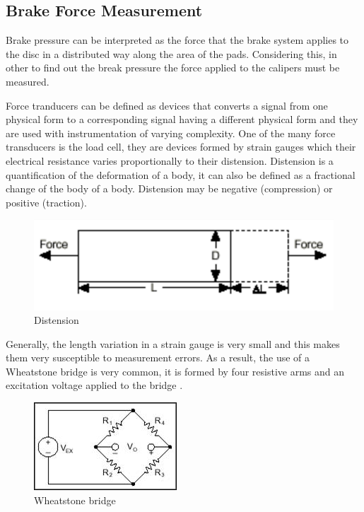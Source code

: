 \subsection{Brake Force Measurement}\label{ssec:brakeForceMeasurement}

	Brake pressure can be interpreted as the force that the brake system applies to the disc in a distributed way along the area of the pads. Considering this, in other to find out the break pressure the force applied to the calipers must be measured.
	\par
	Force tranducers can be defined as devices that converts a signal from one physical form to a corresponding signal having a different physical form \cite{palla2012sensors} and they are used with instrumentation of varying complexity. One of the many force transducers is the load cell, they are devices formed by strain gauges which their electrical resistance varies proportionally to their distension. Distension is a quantification of the deformation of a body, it can also be defined as a fractional change of the body of a body. Distension may be negative (compression) or positive (traction).

	\begin{figure}[htbp]
		\centering
			\includegraphics[width=.5\textwidth]{figuras/fig-distension.png}
		\caption{Distension \cite{strain-def}}
		\label{fig:distension}
	\end{figure}

	Generally, the length variation in a strain gauge is very small and this makes them very susceptible to measurement errors. As a result, the use of a Wheatstone bridge is very common, it is formed by four resistive arms and an excitation voltage applied to the bridge \cite{window1982strain}.

	\begin{figure}[htbp]
		\centering
			\includegraphics[width=.5\textwidth]{figuras/fig-wheatstone.jpg}
		\caption{Wheatstone bridge \cite{wheat-bridge}}
		\label{fig:wheatstone}
	\end{figure}

